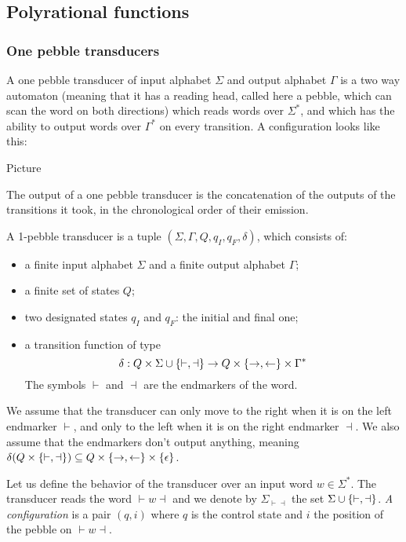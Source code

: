\subsection{Polyrational functions}

\subsubsection{One pebble transducers}
A one pebble transducer of input alphabet $\Sigma$ and output alphabet $\Gamma$ is a two way automaton (meaning that it has a reading head, called here a pebble, which can scan the word on both directions) which reads words over $\Sigma^*$, and which has the ability to output words over $\Gamma^*$ on every transition. A configuration looks like this:
\begin{center}
Picture
\end{center} 
The output of a one pebble transducer is the concatenation of the outputs of the transitions it took, in the chronological order of their emission.

\begin{definition}\label{def:1pebble}
A 1-pebble transducer is a tuple $(\Sigma,\Gamma, Q, q_I, q_F, \delta)$, which consists of:
\begin{itemize}
\item a finite input alphabet $\Sigma$ and a finite output alphabet $\Gamma$; 
\item a finite set of states $Q$;
\item two designated states $q_I$ and $q_F$: the initial and final one;
\item  a transition function of type 
$$\delta : Q\times \Sigma\cup\{\vdash,\dashv\} \to Q\times\{\rightarrow,\leftarrow\}\times\Gamma^*$$
The symbols  $\vdash$ and $\dashv$ are the endmarkers of the word. 
\end{itemize}
We assume that the transducer can only move to the right when it is on the left endmarker $\vdash$, and only to the left when  it is on the right endmarker $\dashv$. We also assume that the endmarkers don't output anything, meaning  $\delta(Q\times\{\vdash,\dashv\})\subseteq Q\times\{\rightarrow,\leftarrow\}\times \{\epsilon\}$.
 \end{definition}


Let us define the behavior of the transducer over an input word $w\in\Sigma^*$. The transducer reads the word ${\vdash} w{\dashv}$ and we denote by $\Sigma_{\vdash\dashv}$ the set  $\Sigma\cup\{\vdash,\dashv\}$. \emph{A configuration} is a pair $(q,i)$ where $q$ is the control state and $i$ the position of the pebble on ${\vdash} w{\dashv}$. 


